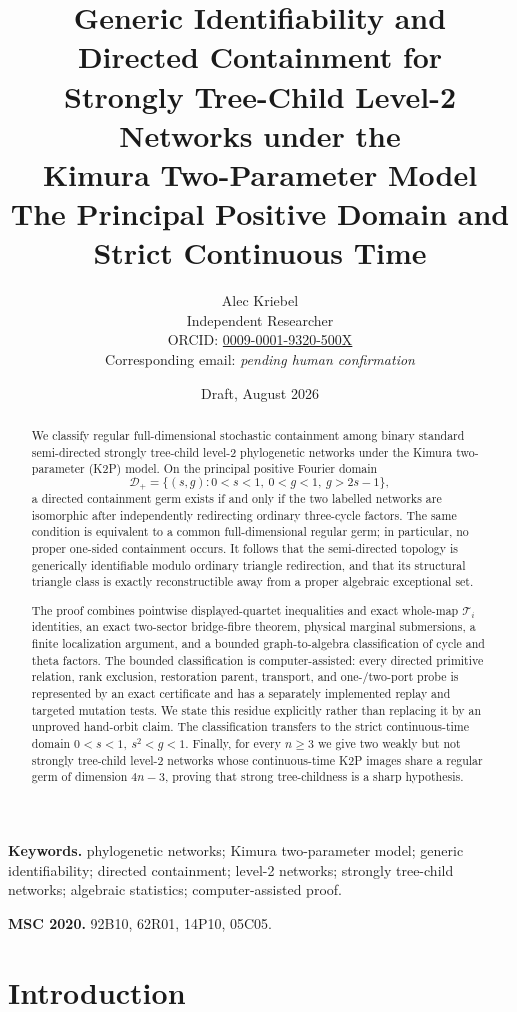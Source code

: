 \documentclass[11pt]{article}
\title{Generic Identifiability and Directed Containment for\\
Strongly Tree-Child Level-2 Networks under the\\
Kimura Two-Parameter Model\\
\large The Principal Positive Domain and Strict Continuous Time}
\author{Alec Kriebel\\
\small Independent Researcher\\
\small ORCID: \href{https://orcid.org/0009-0001-9320-500X}
{0009-0001-9320-500X}\\
\small Corresponding email: \emph{pending human confirmation}}
\date{Draft, August 2026}
\theoremstyle{remark}
\newcommand{\Dplus}{\mathcal D_+}
\newcommand{\1}{\mathbf 1}
\begin{document}
\maketitle

\begin{abstract}
We classify regular full-dimensional stochastic containment among binary
standard semi-directed strongly tree-child level-2 phylogenetic networks
under the Kimura two-parameter (K2P) model.  On the principal positive
Fourier domain
\[
 \Dplus=\{(s,g):0<s<1,\ 0<g<1,\ g>2s-1\},
\]
a directed containment germ exists if and only if the two labelled networks
are isomorphic after independently redirecting ordinary three-cycle factors.
The same condition is equivalent to a common full-dimensional regular germ;
in particular, no proper one-sided containment occurs.  It follows that the
semi-directed topology is generically identifiable modulo ordinary triangle
redirection, and that its structural triangle class is exactly reconstructible
away from a proper algebraic exceptional set.

The proof combines pointwise displayed-quartet inequalities and exact
whole-map \(\mathcal T_i\) identities, an exact two-sector bridge-fibre
theorem, physical marginal submersions, a finite
localization argument, and a bounded graph-to-algebra classification of cycle
and theta factors.  The bounded classification is computer-assisted: every
directed primitive relation, rank exclusion, restoration parent, transport,
and one-/two-port probe is represented by an exact certificate and has a
separately implemented replay and targeted mutation tests.  We state this
residue explicitly rather than replacing it by an unproved hand-orbit claim.
The classification transfers to the strict continuous-time domain
\(0<s<1,\ s^2<g<1\).  Finally, for every \(n\ge3\) we give two weakly but not
strongly tree-child level-2 networks whose continuous-time K2P images share a
regular germ of dimension \(4n-3\), proving that strong tree-childness is a
sharp hypothesis.
\end{abstract}

\noindent\textbf{Keywords.} phylogenetic networks; Kimura two-parameter
model; generic identifiability; directed containment; level-2 networks;
strongly tree-child networks; algebraic statistics; computer-assisted proof.

\medskip
\noindent\textbf{MSC 2020.} 92B10, 62R01, 14P10, 05C05.

\section{Introduction}\label{sec:introduction}
\end{document}
